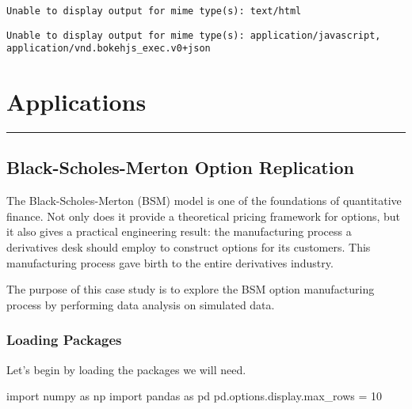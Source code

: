 \documentclass[
  letterpaper,
  DIV=11,
  numbers=noendperiod]{scrreprt}
\newenvironment{Shaded}{\begin{snugshade}}{\end{snugshade}}
\newcommand{\DecValTok}[1]{\textcolor[rgb]{0.68,0.00,0.00}{#1}}
\newcommand{\ImportTok}[1]{\textcolor[rgb]{0.00,0.46,0.62}{#1}}
\newcommand{\NormalTok}[1]{\textcolor[rgb]{0.00,0.23,0.31}{#1}}
\newcommand{\OperatorTok}[1]{\textcolor[rgb]{0.37,0.37,0.37}{#1}}
\begin{document}
\begin{verbatim}
Unable to display output for mime type(s): text/html
\end{verbatim}

\begin{verbatim}
Unable to display output for mime type(s): application/javascript, application/vnd.bokehjs_exec.v0+json
\end{verbatim}

\part{Applications}

\begin{center}\rule{0.5\linewidth}{0.5pt}\end{center}

\hypertarget{black-scholes-merton-option-replication}{%
\chapter{Black-Scholes-Merton Option
Replication}\label{black-scholes-merton-option-replication}}

The Black-Scholes-Merton (BSM) model is one of the foundations of
quantitative finance. Not only does it provide a theoretical pricing
framework for options, but it also gives a practical engineering result:
the manufacturing process a derivatives desk should employ to construct
options for its customers. This manufacturing process gave birth to the
entire derivatives industry.

The purpose of this case study is to explore the BSM option
manufacturing process by performing data analysis on simulated data.

\hypertarget{loading-packages-6}{%
\section{Loading Packages}\label{loading-packages-6}}

Let's begin by loading the packages we will need.

\begin{Shaded}
\begin{Highlighting}[]
\ImportTok{import}\NormalTok{ numpy }\ImportTok{as}\NormalTok{ np}
\ImportTok{import}\NormalTok{ pandas }\ImportTok{as}\NormalTok{ pd}
\NormalTok{pd.options.display.max\_rows }\OperatorTok{=} \DecValTok{10}
\end{Highlighting}
\end{Shaded}
\end{document}
